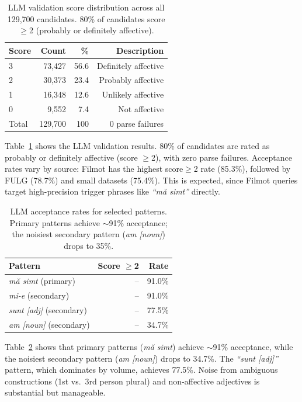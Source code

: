 \documentclass[11pt]{article}
\begin{document}
\begin{table}[t]
    \centering
    \small
    \begin{tabular}{lrrr}
        \toprule
        Score & Count & \% & Description \\
        \midrule
        3 & 73,427 & 56.6 & Definitely affective \\
        2 & 30,373 & 23.4 & Probably affective \\
        1 & 16,348 & 12.6 & Unlikely affective \\
        0 & 9,552 & 7.4 & Not affective \\
        \midrule
        Total & 129,700 & 100 & 0 parse failures \\
        \bottomrule
    \end{tabular}
    \caption{LLM validation score distribution across all 129,700 candidates. 80\% of candidates score $\geq$2 (probably or definitely affective).}
    \label{tab:llm-scores}
\end{table}

Table~\ref{tab:llm-scores} shows the LLM validation results. 80\% of candidates are rated as probably or definitely affective (score $\geq$2), with zero parse failures. Acceptance rates vary by source: Filmot has the highest score$\geq$2 rate (85.3\%), followed by FULG (78.7\%) and small datasets (75.4\%). This is expected, since Filmot queries target high-precision trigger phrases like \textit{``m\u{a} simt''} directly.

\begin{table}[t]
    \centering
    \small
    \begin{tabular}{lrr}
        \toprule
        Pattern & Score $\geq$2 & Rate \\
        \midrule
        \textit{m\u{a} simt} (primary) & -- & 91.0\% \\
        \textit{mi-e} (secondary) & -- & 91.0\% \\
        \textit{sunt [adj]} (secondary) & -- & 77.5\% \\
        \textit{am [noun]} (secondary) & -- & 34.7\% \\
        \bottomrule
    \end{tabular}
    \caption{LLM acceptance rates for selected patterns. Primary patterns achieve $\sim$91\% acceptance; the noisiest secondary pattern (\textit{am [noun]}) drops to 35\%.}
    \label{tab:pattern-precision}
\end{table}

Table~\ref{tab:pattern-precision} shows that primary patterns (\textit{m\u{a} simt}) achieve $\sim$91\% acceptance, while the noisiest secondary pattern (\textit{am [noun]}) drops to 34.7\%. The \textit{``sunt [adj]''} pattern, which dominates by volume, achieves 77.5\%. Noise from ambiguous constructions (1st vs.\ 3rd person plural) and non-affective adjectives is substantial but manageable.
\end{document}
